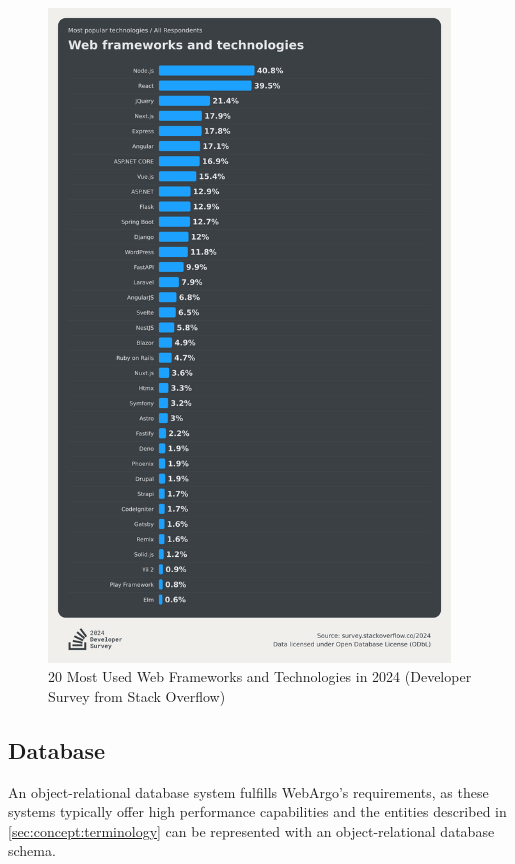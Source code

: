 \begin{figure}[htbp]
  \centering
  \includegraphics[width=0.95\textwidth]{gfx/figures/FrameworkSurvey2024.png}
  \caption{20 Most Used Web Frameworks and Technologies in 2024 (Developer Survey from Stack Overflow) \cite{frontend:popularity}}
  \label{fig:methodology:popularFE}
\end{figure}

\subsection{Database}
An object-relational database system fulfills WebArgo's requirements, as these systems typically offer high performance capabilities and the entities described in \autoref{sec:concept:terminology} can be represented with an object-relational database schema.

